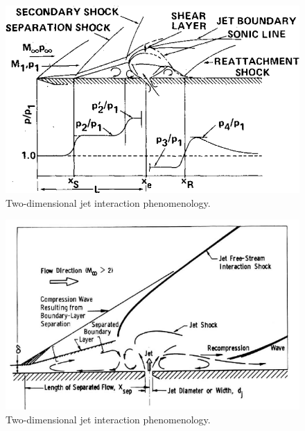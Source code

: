 \documentclass[12pt]{article}
\begin{document}

\begin{figure}[H]
    \centering
    \includegraphics[width=0.9\linewidth]{figs/Screenshot from 2025-06-24 13-30-27.png}
    \caption{Two-dimensional jet interaction phenomenology.}
    \label{fig:jet2d0}
\end{figure}

\begin{figure}[H]
    \centering
    \includegraphics[width=\linewidth]{figs/Screenshot from 2025-06-26 09-59-14.png}
    \caption{Two-dimensional jet interaction phenomenology.}
    \label{fig:jet2d}
\end{figure}
\end{document}
